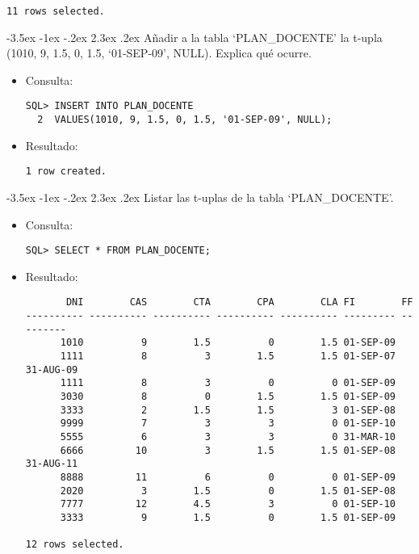 \documentclass[11pt]{report}
\makeatletter
\renewcommand\chapter{\@startsection{chapter}{0}{\z@}%
    {-3.5ex \@plus -1ex \@minus -.2ex}%
    {2.3ex \@plus.2ex}%
    {\normalfont\Large\bfseries}}
\makeatother
\begin{document}
\begin{itemize}
\begin{verbatim}
11 rows selected.
  \end{verbatim}
\end{itemize}

\chapter{Añadir a la tabla ‘PLAN\_DOCENTE’ la t-upla (1010, 9, 1.5, 0, 1.5, ‘01-SEP-09’, NULL). Explica qué ocurre.}
\begin{itemize}
  \item Consulta:
  \begin{verbatim}
SQL> INSERT INTO PLAN_DOCENTE
  2  VALUES(1010, 9, 1.5, 0, 1.5, '01-SEP-09', NULL);
  \end{verbatim}
  \item{Resultado:}
  \begin{verbatim}
1 row created.
  \end{verbatim}
\end{itemize}

\newpage

\chapter{Listar las t-uplas de la tabla ‘PLAN\_DOCENTE’.}
\begin{itemize}
  \item Consulta:
  \begin{verbatim}
SQL> SELECT * FROM PLAN_DOCENTE;
  \end{verbatim}
  \item{Resultado:}
  \begin{verbatim}
       DNI        CAS        CTA        CPA        CLA FI        FF                                 
---------- ---------- ---------- ---------- ---------- --------- ---------                          
      1010          9        1.5          0        1.5 01-SEP-09                                    
      1111          8          3        1.5        1.5 01-SEP-07 31-AUG-09                          
      1111          8          3          0          0 01-SEP-09                                    
      3030          8          0        1.5        1.5 01-SEP-09                                    
      3333          2        1.5        1.5          3 01-SEP-08                                    
      9999          7          3          3          0 01-SEP-10                                    
      5555          6          3          3          0 31-MAR-10                                    
      6666         10          3        1.5        1.5 01-SEP-08 31-AUG-11                          
      8888         11          6          0          0 01-SEP-09                                    
      2020          3        1.5          0        1.5 01-SEP-08                                    
      7777         12        4.5          3          0 01-SEP-10                                    
      3333          9        1.5          0        1.5 01-SEP-09                                    

12 rows selected. 
  \end{verbatim}
\end{itemize}
\end{document}

